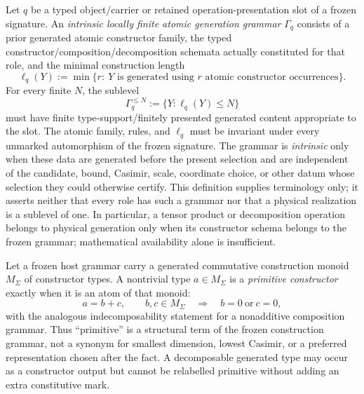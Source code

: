 \documentclass[12pt,a4paper]{article}
\begin{document}
\begin{definition}
\label{p2:def:intrinsic-generation-grammar}
Let \(q\) be a typed object/carrier or retained operation-presentation slot of
a frozen signature.  An \emph{intrinsic locally finite atomic generation
grammar} \(\Gamma_q\) consists of a prior generated atomic constructor family,
the typed constructor/composition/decomposition schemata actually constituted
for that role, and the minimal construction
length
\[
 \ell_q(Y):=\min\{r:\ Y\text{ is generated using }r
 \text{ atomic constructor occurrences}\}.
\]
For every finite \(N\), the sublevel
\[
 \Gamma_q^{\le N}:=\{Y:\ell_q(Y)\le N\}
\]
must have finite type-support/finitely presented generated content appropriate
to the slot.  The atomic family, rules, and \(\ell_q\) must be invariant under
every unmarked automorphism of the frozen signature.  The grammar is
\emph{intrinsic} only when these data are generated before the present
selection and are independent of the candidate, bound, Casimir, scale,
coordinate choice, or other datum whose selection they could otherwise
certify.  This definition supplies terminology only; it asserts neither that
every role has such a grammar nor that a physical realization is a sublevel of
one.  In particular, a tensor product or decomposition operation belongs to
physical generation only when its constructor schema belongs to the frozen
grammar; mathematical availability alone is insufficient.
\end{definition}

\begin{definition}
\label{p2:def:primitive-constructor-atom}
Let a frozen host grammar carry a generated commutative construction monoid
\(M_\Sigma\) of constructor types.  A nontrivial type \(a\in M_\Sigma\) is a
\emph{primitive constructor} exactly when it is an atom of that monoid:
\[
 a=b+c,\qquad b,c\in M_\Sigma
 \quad\Longrightarrow\quad b=0\ \text{or}\ c=0,
\]
with the analogous indecomposability statement for a nonadditive composition
grammar.  Thus ``primitive'' is a structural term of the frozen construction
grammar, not a synonym for smallest dimension, lowest Casimir, or a preferred
representation chosen after the fact.  A decomposable generated type may occur
as a constructor output but cannot be relabelled primitive without adding an
extra constitutive mark.
\end{definition}
\end{document}

